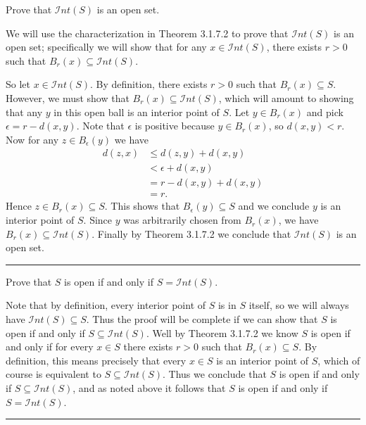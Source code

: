 \documentclass[12pt]{article}
\newcommand{\e}{\epsilon} %
\newcommand{\ints}{\mathcal{I}nt(S)}
\newenvironment{ppart}[1]{\noindent {\bf (#1) }}{\medskip}
\newenvironment{proof}{\noindent {\bf Proof: }}{\hfill
\rule{1mm}{3mm} \bigskip}
\begin{document}
\begin{ppart}{b} Prove that $\mathcal{I}nt(S)$ is an open set.\end{ppart}

\begin{proof} We will use the characterization in Theorem 3.1.7.2 to prove that $\ints$ is an open set; specifically we will show that for any $x\in\ints$, there exists $r>0$ such that $B_r(x) \subseteq \ints$.

So let $x\in \ints$. By definition, there exists $r>0$ such that $B_r(x) \subseteq S$. However, we must show that $B_r(x)\subseteq \ints$, which will amount to showing that any $y$ in this open ball is an interior point of $S$. Let $y\in B_r(x)$ and pick $\e = r - d(x,y)$. Note that $\e$ is positive because $y\in B_r(x)$, so $d(x,y)< r$. Now for any $z\in B_\e ( y)$ we have
\begin{align*}
d(z,x) &\le d(z,y) + d(x,y)\\
	& < \e + d(x,y)\\
	&= r - d(x,y) + d(x,y)\\
	&= r.
\end{align*} Hence $z\in B_r(x)\subseteq S$. This shows that $B_\e(y)\subseteq S$ and we conclude $y$ is an interior point of $S$. Since $y$ was arbitrarily chosen from $B_r(x)$, we have $B_r(x) \subseteq \ints$. Finally by Theorem 3.1.7.2 we conclude that $\ints$ is an open set.
\end{proof}


\begin{ppart}{c} Prove that $S$ is open if and only if $S=\mathcal{I}nt(S)$.\end{ppart}

\begin{proof} Note that by definition, every interior point of $S$ is in $S$ itself, so we will always have $\ints\subseteq S$. Thus the proof will be complete if we can show that $S$ is open if and only if $S\subseteq \ints$. Well by Theorem 3.1.7.2 we know $S$ is open if and only if for every $x\in S$ there exists $r>0$ such that $B_r(x)\subseteq S$. By definition, this means precisely that every $x\in S$ is an interior point of $S$, which of course is equivalent to $S\subseteq \ints$. Thus we conclude that $S$ is open if and only if $S\subseteq \ints$, and as noted above it follows that $S$ is open if and only if $S=\ints$.\end{proof}

\vspace{2cm}
\end{document}
